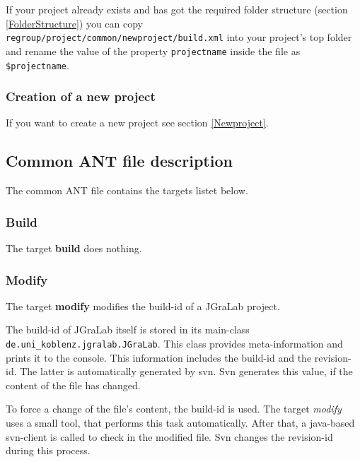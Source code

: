 \documentclass
[
		a4paper,
		twoside, 										
		BCOR10mm,											
		11pt,												
		halfparskip,								
		bigheadings,								
		notitlepage,			
		pdftex											
]
{scrartcl}
\begin{document}
If your project already exists and has got the required folder structure (section \ref{FolderStructure}) you can copy \texttt{regroup/project/common/newproject/build.xml} into your project's top folder and rename the value of the property \texttt{projectname} inside the file as \texttt{\$projectname}. 


\subsubsection{Creation of a new project}
\label{CreationOfANewSuitableProject}

If you want to create a new project see section \ref{Newproject}.



\subsection{Common ANT file description}
\label{CommonANTFileDescription}

The common ANT file contains the targets listet below.


\subsubsection{Build}
\label{Build}

The target \textbf{build} does nothing.


\subsubsection{Modify}
\label{Modify}

The target \textbf{modify} modifies the build-id of a JGraLab project.

The build-id of JGraLab itself is stored in its main-class \texttt{de.uni\_koblenz.jgralab.JGraLab}.
This class provides meta-information and prints it to the console. This information includes the build-id and the revision-id. The latter is automatically generated by svn. Svn generates this value, if the content of the file has changed.

To force a change of the file's content, the build-id is used. The target \emph{modify} uses a small tool, that performs this task automatically. After that, a java-based svn-client is called to check in the modified file. Svn changes the revision-id during this process.
\end{document}
